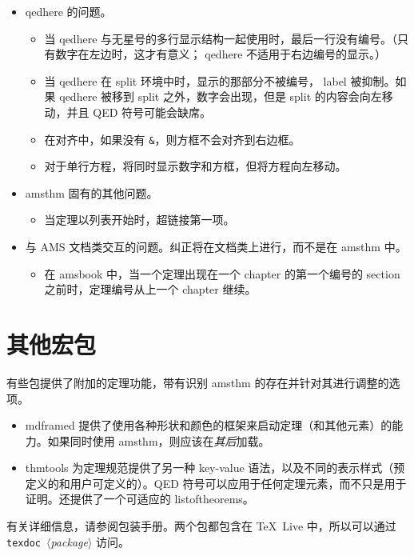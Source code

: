 \documentclass{article}
\newcommand{\ntt}{%
  \fontfamily\ttdefault \fontseries\mddefault \fontshape\updefault
  \selectfont
}
\DeclareRobustCommand{\cn}[1]{{\ntt\bslchar#1}}
\DeclareRobustCommand{\cls}[1]{{\ntt#1}}
\DeclareRobustCommand{\pkg}[1]{\textsf{#1}}
\DeclareRobustCommand{\env}[1]{{\ntt#1}}
\def\<#1>{{\normalfont$\langle$\textit{#1}$\rangle$}}
\begin{document}
\begin{itemize}
\item \cn{qedhere} 的问题。 %
 \begin{itemize}
  \item 当 \cn{qedhere} 与无星号的多行显示结构一起使用时，最后一行没有编号。（只有数字在左边时，这才有意义；\cn{qedhere} 不适用于右边编号的显示。）
  \item 当 \cn{qedhere} 在 \env{split} 环境中时，显示的那部分不被编号，\cn{label} 被抑制。如果 \cn{qedhere} 被移到 \env{split} 之外，数字会出现，但是 \env{split} 的内容会向左移动，并且 QED 符号可能会缺席。
  \item 在对齐中，如果没有 \verb+&+，则方框不会对齐到右边框。
  \item 对于单行方程，将同时显示数字和方框，但将方程向左移动。
 \end{itemize}
\item \pkg{amsthm} 固有的其他问题。
 \begin{itemize}
  \item 当定理以列表开始时，超链接第一项。
 \end{itemize}
\item 与 AMS 文档类交互的问题。纠正将在文档类上进行，而不是在 \pkg{amsthm} 中。
 \begin{itemize}
  \item 在 \cls{amsbook} 中，当一个定理出现在一个 chapter 的第一个编号的 section 之前时，定理编号从上一个 chapter 继续。
 \end{itemize}
\end{itemize}


\section{其他宏包}

有些包提供了附加的定理功能，带有识别 \pkg{amsthm} 的存在并针对其进行调整的选项。
\begin{itemize}
\itemsep=.5\itemsep
\item \pkg{mdframed} \cite{MDF} 提供了使用各种形状和颜色的框架来启动定理（和其他元素）的能力。如果同时使用 \pkg{amsthm}，则应该在\emph{其后}加载。
\item \pkg{thmtools} \cite{THT} 为定理规范提供了另一种 key-value 语法，以及不同的表示样式（预定义的和用户可定义的）。QED 符号可以应用于任何定理元素，而不只是用于证明。还提供了一个可适应的 \cn{listoftheorems}。
\end{itemize}
有关详细信息，请参阅包装手册。两个包都包含在 \TeX~Live 中，所以可以通过 \texttt{texdoc}~\<package> 访问。
\end{document}
